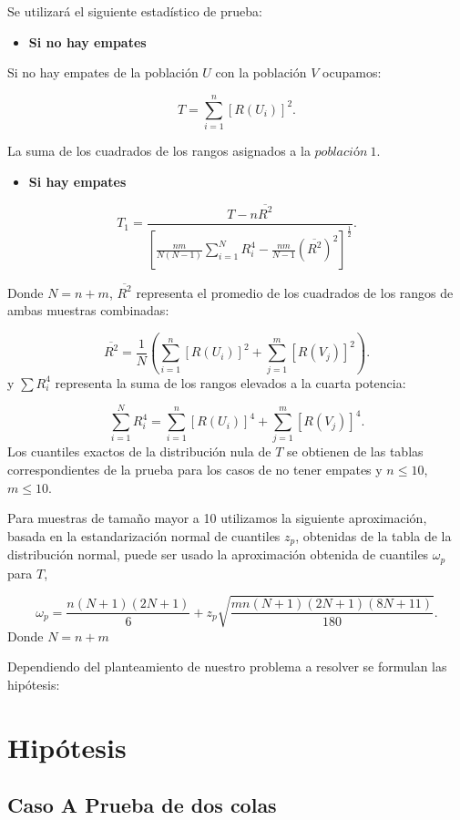\documentclass[
  a4paper,
  oneside,
  openany]{book}
\providecommand{\tightlist}{%
  \setlength{\itemsep}{0pt}\setlength{\parskip}{0pt}}
\begin{document}
Se utilizará el siguiente estadístico de prueba:

\begin{itemize}
\tightlist
\item
  \textbf{Si no hay empates}
\end{itemize}

Si no hay empates de la población \(U\) con la población \(V\) ocupamos:

\[T=\sum_{i=1}^{n}[R(U_{i})]^2.\]

La suma de los cuadrados de los rangos asignados a la \(población \ 1\).

\begin{itemize}
\tightlist
\item
  \textbf{Si hay empates}
\end{itemize}

\[T_{1} = \frac{T-n\overline{R^2}}{\left[\frac{nm}{N(N-1)}\sum_{i=1}^{N}R_{i}^4-\frac{nm}{N-1}(\overline{R^2})^2\right]^\frac{1}{2}}.\]

Donde \(N= n+m\), \(\overline{R^2}\) representa el promedio de los cuadrados de los rangos de ambas muestras combinadas:

\[\overline{R^2}= \frac{1}{N}\left(\sum_{i=1}^{n}[R(U_{i})]^2+\sum_{j=1}^{m}[R(V_{j})]^2\right).\]
y \(\sum R_{i}^4\) representa la suma de los rangos elevados a la cuarta potencia:

\[ \sum_{i=1}^{N}R_{i}^4= \sum_{i=1}^{n}[R(U_{i})]^4+\sum_{j=1}^{m}[R(V_{j})]^4.\]
Los cuantiles exactos de la distribución nula de \(T\) se obtienen de las tablas correspondientes de la prueba para los casos de no tener empates y \(n \leq 10\), \(m \leq 10\).

Para muestras de tamaño mayor a 10 utilizamos la siguiente aproximación, basada en la estandarización normal de cuantiles \(z_p\), obtenidas de la tabla de la distribución normal, puede ser usado la aproximación obtenida de cuantiles \(\omega_p\) para \(T\),

\[\omega_p= \frac{n(N+1)(2N+1)}{6}+z_{p}\sqrt{\frac{mn(N+1)(2N+1)(8N+11)}{180}}.\]
Donde \(N= n+m\)

Dependiendo del planteamiento de nuestro problema a resolver se formulan las hipótesis:

\hypertarget{hipuxf3tesis-7}{%
\section{Hipótesis}\label{hipuxf3tesis-7}}

\hypertarget{caso-a-prueba-de-dos-colas-6}{%
\subsection*{Caso A Prueba de dos colas}\label{caso-a-prueba-de-dos-colas-6}}
\end{document}
